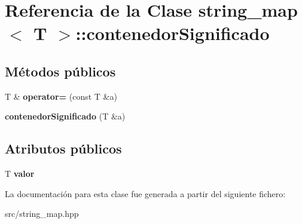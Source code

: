 \hypertarget{classstring__map_1_1contenedorSignificado}{\section{Referencia de la Clase string\+\_\+map$<$ T $>$\+:\+:contenedor\+Significado}
\label{classstring__map_1_1contenedorSignificado}
}
\subsection*{Métodos públicos}
\begin{DoxyCompactItemize}
\item 
\hypertarget{classstring__map_1_1contenedorSignificado_a678eb6a88f99a8cfebb59aee3f24f7a7}{T \& {\bfseries operator=} (const T \&a)}\label{classstring__map_1_1contenedorSignificado_a678eb6a88f99a8cfebb59aee3f24f7a7}

\item 
\hypertarget{classstring__map_1_1contenedorSignificado_a788e8e0273550d06d92111ba7309381b}{{\bfseries contenedor\+Significado} (T \&a)}\label{classstring__map_1_1contenedorSignificado_a788e8e0273550d06d92111ba7309381b}

\end{DoxyCompactItemize}
\subsection*{Atributos públicos}
\begin{DoxyCompactItemize}
\item 
\hypertarget{classstring__map_1_1contenedorSignificado_a5df479a08f36232d823ebcefb9356efc}{T {\bfseries valor}}\label{classstring__map_1_1contenedorSignificado_a5df479a08f36232d823ebcefb9356efc}

\end{DoxyCompactItemize}


La documentación para esta clase fue generada a partir del siguiente fichero\+:\begin{DoxyCompactItemize}
\item 
src/string\+\_\+map.\+hpp\end{DoxyCompactItemize}
